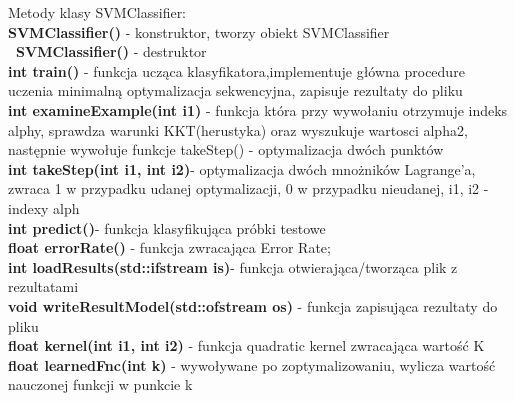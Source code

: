 \documentclass[11pt]{article}
\begin{document}
\begin{enumerate}
Metody klasy SVMClassifier:\\
\textbf{SVMClassifier()} - konstruktor, tworzy obiekt SVMClassifier\\
\textbf{~SVMClassifier()} - destruktor\\
\textbf{int train() }- funkcja ucząca klasyfikatora,implementuje główna procedure uczenia minimalną optymalizacja sekwencyjna, zapisuje rezultaty do pliku\\
\textbf{int examineExample(int i1) }- funkcja która przy wywołaniu otrzymuje indeks alphy, sprawdza warunki KKT(herustyka) oraz wyszukuje wartosci alpha2, następnie wywołuje funkcje takeStep() - optymalizacja dwóch punktów\\
\textbf{int takeStep(int i1, int i2)}- optymalizacja dwóch mnożników Lagrange'a, zwraca 1 w przypadku udanej optymalizacji, 0 w przypadku nieudanej, i1, i2 - indexy alph\\
\textbf{int predict()}- funkcja klasyfikująca próbki testowe\\
\textbf{float errorRate()} - funkcja zwracająca Error Rate;\\
\textbf{int loadResults(std::ifstream is)}- funkcja otwierająca/tworząca plik z rezultatami \\
\textbf{void writeResultModel(std::ofstream os)} - funkcja zapisująca rezultaty do pliku\\
\textbf{float kernel(int i1, int i2)} - funkcja quadratic kernel zwracająca wartość K\\
\textbf{float learnedFnc(int k)} - wywoływane po zoptymalizowaniu, wylicza wartość nauczonej funkcji w punkcie k\\



\end{enumerate}
\end{document}
